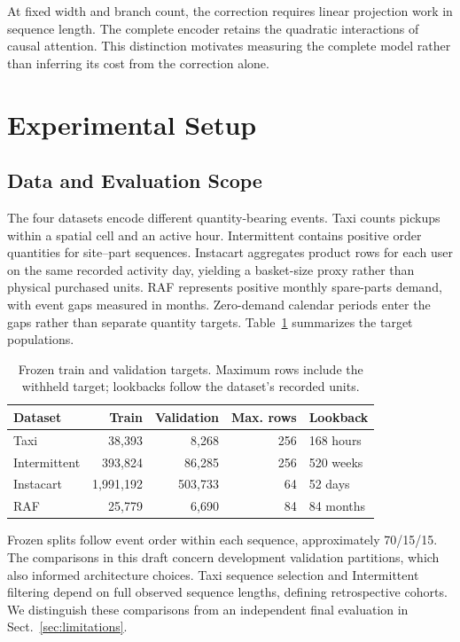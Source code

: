 \documentclass[runningheads]{llncs}
\begin{document}
At fixed width and branch count, the correction requires linear projection
work in sequence length. The complete encoder retains the quadratic
interactions of causal attention. This distinction motivates measuring the
complete model rather than inferring its cost from the correction alone.

\section{Experimental Setup}
\subsection{Data and Evaluation Scope}
The four datasets encode different quantity-bearing events. Taxi counts
pickups within a spatial cell and an active hour. Intermittent contains
positive order quantities for site--part sequences. Instacart aggregates
product rows for each user on the same recorded activity day, yielding a
basket-size proxy rather than physical purchased units. RAF represents
positive monthly spare-parts demand, with event gaps measured in months.
Zero-demand calendar periods enter the gaps rather than separate quantity
targets. Table~\ref{tab:data} summarizes the target populations.

\begin{table}[t]
\caption{Frozen train and validation targets. Maximum rows include the
withheld target; lookbacks follow the dataset's recorded units.}
\label{tab:data}\centering\small
\begin{tabular}{lrrrl}
\toprule
Dataset & Train & Validation & Max. rows & Lookback\\
\midrule
Taxi & 38,393 & 8,268 & 256 & 168 hours\\
Intermittent & 393,824 & 86,285 & 256 & 520 weeks\\
Instacart & 1,991,192 & 503,733 & 64 & 52 days\\
RAF & 25,779 & 6,690 & 84 & 84 months\\
\bottomrule
\end{tabular}
\end{table}

Frozen splits follow event order within each sequence, approximately
70/15/15. The comparisons in this draft concern development validation
partitions, which also informed architecture choices. Taxi sequence
selection and Intermittent filtering depend on full observed sequence
lengths, defining retrospective cohorts. We distinguish these comparisons
from an independent final evaluation in Sect.~\ref{sec:limitations}.
\end{document}
